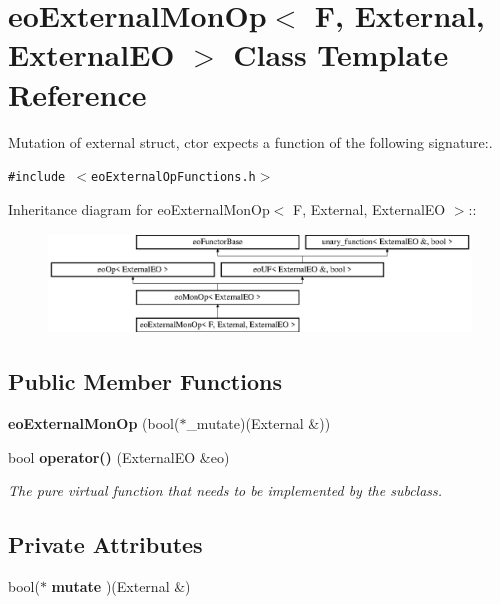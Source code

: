 \section{eo\-External\-Mon\-Op$<$ F, External, External\-EO $>$ Class Template Reference}
\label{classeo_external_mon_op}
Mutation of external struct, ctor expects a function of the following signature:.  


{\tt \#include $<$eo\-External\-Op\-Functions.h$>$}

Inheritance diagram for eo\-External\-Mon\-Op$<$ F, External, External\-EO $>$::\begin{figure}[H]
\begin{center}
\leavevmode
\includegraphics[height=2.64775cm]{classeo_external_mon_op}
\end{center}
\end{figure}
\subsection*{Public Member Functions}
\begin{CompactItemize}
\item 
{\bf eo\-External\-Mon\-Op} (bool($\ast$\_\-mutate)(External \&))\label{classeo_external_mon_op_a0}

\item 
bool {\bf operator()} (External\-EO \&eo)\label{classeo_external_mon_op_a1}

\begin{CompactList}\small\item\em The pure virtual function that needs to be implemented by the subclass. \item\end{CompactList}\end{CompactItemize}
\subsection*{Private Attributes}
\begin{CompactItemize}
\item 
bool($\ast$ {\bf mutate} )(External \&)\label{classeo_external_mon_op_r0}

\end{CompactItemize}


